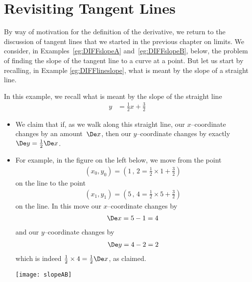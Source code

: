 \section{Revisiting Tangent Lines}\label{sec_2_1}


By way of motivation for the definition of the derivative, we return
to the discussion of tangent lines that we started in the previous
chapter on limits. We consider, in  Examples~\ref{eg:DIFFslopeA} and~\ref{eg:DIFFslopeB},
below, the problem of finding the slope of the tangent line to a curve at a point. But
let us start  by recalling, in Example \ref{eg:DIFFlineslope}, what is meant by the slope
of a straight line.
\begin{eg}\label{eg:DIFFlineslope}
In this example, we recall what is meant by the slope of the straight line
\begin{align*}
y&=\tfrac{1}{2}x+\tfrac{3}{2}
\end{align*}
\begin{itemize}
 \item We claim that if, as we walk along this straight line, our $x$--coordinate changes
by an amount~$\De x$, then our $y$--coordinate changes by exactly~$\De y =
\tfrac{1}{2}\De
x$.

\item For example, in the figure on the left below, we move from the point
\begin{align*}
(x_0,y_0)=(1\,,\,2=\tfrac{1}{2}\times 1+\tfrac{3}{2})
\end{align*}
on the line to the point
\begin{align*}
(x_1,y_1)=(5\,,\,4=\tfrac{1}{2}\times 5+\tfrac{3}{2})
\end{align*}
on the line. In this move our $x$--coordinate changes by
\begin{align*}
\De x= 5-1=4
\end{align*}
and our $y$--coordinate changes by
\begin{align*}
\De y=4-2=2
\end{align*}
which is indeed $\tfrac{1}{2}\times 4=\tfrac{1}{2}\De x$, as claimed.

\begin{wfig}
\begin{center}
    \texttt{[image: slopeAB]}
\end{center}
\end{wfig}


\end{itemize}
\end{eg}
